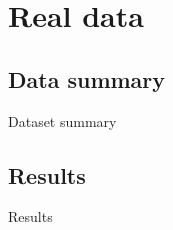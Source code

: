 \section{Real data}

\subsection{Data summary}

\begin{frame}{Dataset summary}
  
\end{frame}

\subsection{Results}

\begin{frame}{Results}
\end{frame}
